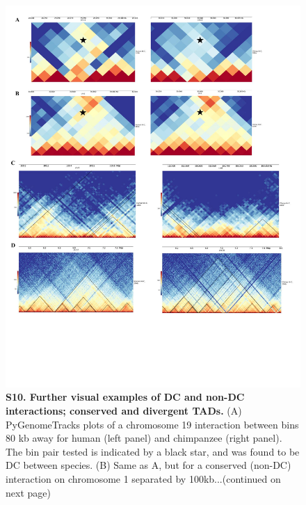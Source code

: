 \begin{figure}[!htb]
\centering
\includegraphics[width=6in]{img/figS10.1.pdf}
\caption[Further visual examples of DC and non-DC interactions; conserved and divergent TADs.]{\textbf{S10. Further visual examples of DC and non-DC interactions; conserved and divergent TADs.} (A) PyGenomeTracks plots \cite{Ramirez.2018} of a chromosome 19 interaction between bins 80 kb away for human (left panel) and chimpanzee (right panel). The bin pair tested is indicated by a black star, and was found to be DC between species. (B) Same as A, but for a conserved (non-DC) interaction on chromosome 1 separated by 100kb...(continued on next page)}
\label{fig:ch02-figS10}
\end{figure}

